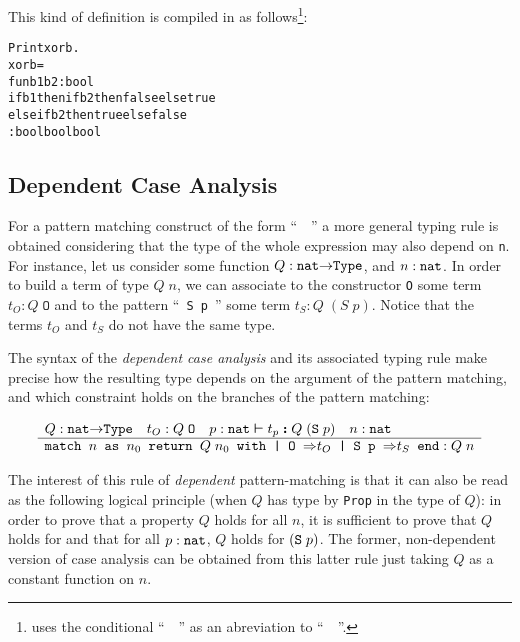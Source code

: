 \documentclass[11pt]{article}
\begin{document}
This kind of definition is compiled in {\coq} as follows\footnote{{\coq} uses
the conditional ``~~'' as an abreviation to
``~~''.}:

\begin{alltt}
Print xorb.
xorb = 
fun b1 b2 : bool {\funarrow}
if b1 then if b2 then false else true 
      else if b2 then true else false
     : bool {\arrow} bool {\arrow} bool
\end{alltt}

\subsection{Dependent Case Analysis}
\label{DependentCase}

For a pattern matching construct of the form
``~~'' a more general typing rule
is obtained considering that the type of the whole expression
may also depend on \texttt{n}.
  For instance, let us consider some function 
$Q:\texttt{nat}\mbox{$\rightarrow$}{}\texttt{Type}$, and $n:\mbox{\texttt{nat}}$.
In order to build a term of type $Q\;n$, we can associate
to the constructor \texttt{O} some term $t_O: Q\;\texttt{O}$ and to
the pattern ``~\texttt{S p}~''  some term $t_S : Q\;(S\;p)$.
Notice that the terms $t_O$ and $t_S$ do not have the same type.

The syntax of the \emph{dependent case analysis} and its
associated typing rule make precise how the resulting
type depends on the argument of the pattern matching, and
which constraint holds on the branches of the pattern matching:

\label{Prod-sup-rule}
\[
\begin{array}[t]{l}
Q: \texttt{nat}{\mbox{$\rightarrow$}}\texttt{Type}\quad{t_O}:{{Q\;\texttt{O}}}  \quad
\mbox{$p:\texttt{nat} \boldsymbol{\large \vdash} t_p \boldsymbol{:} {Q\;(\texttt{S}\;p)} $} \quad n:\texttt{nat} \\
\hline
{\texttt{match \(n\) as \(n\sb{0}\) return \(Q\;n\sb{0}\) with | O \mbox{$\Rightarrow$}\(t\sb{O}\) | S p \mbox{$\Rightarrow$}\(t\sb{S}\) end}}:{{Q\;n}}
\end{array}
\]


The interest of this rule of \textsl{dependent} pattern-matching is
that it can also be read as the following logical principle (when $Q$ has type 
by \texttt{Prop} in the type of $Q$): in order to prove
that a property $Q$ holds for all $n$, it is sufficient to prove that
$Q$ holds for {\Z} and that for all $p:\texttt{nat}$, $Q$ holds for
$(\texttt{S}\;p)$.  The former, non-dependent version of case analysis can
be obtained from this latter rule just taking $Q$ as a constant
function on $n$.
\end{document}
